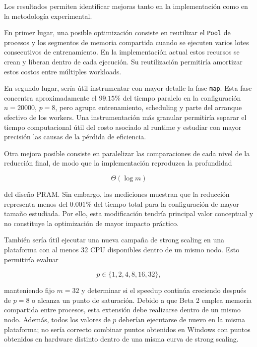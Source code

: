 \documentclass[11pt,a4paper]{article}
\begin{document}
Los resultados permiten identificar mejoras tanto en la implementación como en la
metodología experimental.

En primer lugar, una posible optimización consiste en reutilizar el
\texttt{Pool} de procesos y los segmentos de memoria compartida cuando se ejecuten
varios lotes consecutivos de entrenamiento. En la implementación actual estos recursos
se crean y liberan dentro de cada ejecución. Su reutilización permitiría amortizar
estos costos entre múltiples workloads.

En segundo lugar, sería útil instrumentar con mayor detalle la fase
\texttt{map}. Esta fase concentra aproximadamente el $99.15\%$ del tiempo paralelo
en la configuración $n=20000$, $p=8$, pero agrupa entrenamiento, scheduling y parte
del arranque efectivo de los workers. Una instrumentación más granular permitiría
separar el tiempo computacional útil del costo asociado al runtime y estudiar con
mayor precisión las causas de la pérdida de eficiencia.

Otra mejora posible consiste en paralelizar las comparaciones de cada
nivel de la reducción final, de modo que la implementación reproduzca la profundidad

\begin{equation}
    \Theta(\log m)
\end{equation}

del diseño PRAM. Sin embargo, las mediciones muestran que la reducción representa
menos del $0.001\%$ del tiempo total para la configuración de mayor tamaño estudiada.
Por ello, esta modificación tendría principal valor conceptual y no constituye
la optimización de mayor impacto práctico.

También sería útil ejecutar una nueva campaña de strong scaling en una plataforma
con al menos 32 CPU disponibles dentro de un mismo nodo. Esto permitiría evaluar

\begin{equation}
    p\in\{1,2,4,8,16,32\},
\end{equation}

manteniendo fijo $m=32$ y determinar si el speedup continúa
creciendo después de $p=8$ o alcanza un punto de saturación. Debido a que Beta 2
emplea memoria compartida entre procesos, esta extensión debe realizarse dentro de
un mismo nodo. Además, todos los valores de $p$ deberían ejecutarse de nuevo en
la misma plataforma; no sería correcto combinar puntos obtenidos
en Windows con puntos obtenidos en hardware distinto dentro de una misma curva de
strong scaling.
\end{document}
